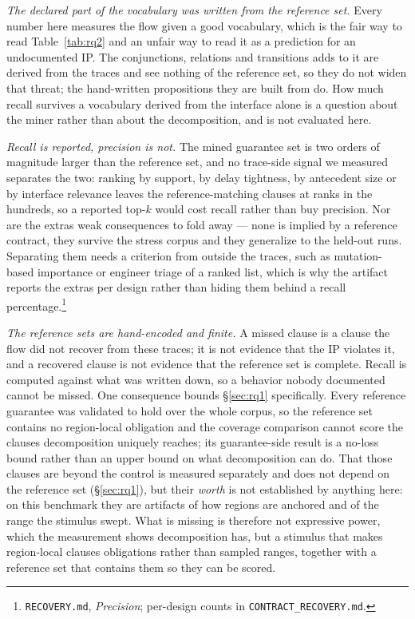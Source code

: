 \emph{The declared part of the vocabulary was written from the reference set.} Every number
here measures the flow given a good vocabulary, which is the fair way to read
Table~\ref{tab:rq2} and an unfair way to read it as a prediction for an undocumented IP. The
conjunctions, relations and transitions \ACE{} adds to it are derived from the traces and see
nothing of the reference set, so they do not widen that threat; the hand-written propositions
they are built from do. How much recall survives a vocabulary derived from the interface alone
is a question about the miner rather than about the decomposition, and is not evaluated here.

\emph{Recall is reported, precision is not.} The mined guarantee set is two orders of
magnitude larger than the reference set, and no trace-side signal we measured separates the
two: ranking by support, by delay tightness, by antecedent size or by interface relevance
leaves the reference-matching clauses at ranks in the hundreds, so a reported top-$k$ would
cost recall rather than buy precision. Nor are the extras weak consequences to fold away ---
none is implied by a reference contract, they survive the stress corpus and they generalize
to the held-out runs. Separating them needs a criterion from outside the traces, such as
mutation-based importance or engineer triage of a ranked list, which is why the artifact
reports the extras per design rather than hiding them behind a recall
percentage.\footnote{\texttt{RECOVERY.md}, \emph{Precision}; per-design counts in
\texttt{CONTRACT\_RECOVERY.md}.}

\emph{The reference sets are hand-encoded and finite.} A missed clause is a clause the flow
did not recover from these traces; it is not evidence that the IP violates it, and a recovered
clause is not evidence that the reference set is complete. Recall is computed against what was
written down, so a behavior nobody documented cannot be missed. One consequence bounds
\S\ref{sec:rq1} specifically. Every reference guarantee was validated to hold over the whole
corpus, so the reference set contains no region-local obligation and the coverage comparison
cannot score the clauses decomposition uniquely reaches; its guarantee-side result is a
no-loss bound rather than an upper bound on what decomposition can do. That those clauses are
beyond the control is measured separately and does not depend on the reference set
(\S\ref{sec:rq1}), but their \emph{worth} is not established by anything here: on this
benchmark they are artifacts of how regions are anchored and of the range the stimulus swept.
What is missing is therefore not expressive power, which the measurement shows decomposition
has, but a stimulus that makes region-local clauses obligations rather than sampled ranges,
together with a reference set that contains them so they can be scored.

